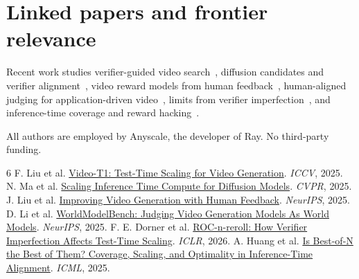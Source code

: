 \documentclass{article}
\begin{document}
\section{Linked papers and frontier relevance}

Recent work studies verifier-guided video search~\cite{videot1}, diffusion candidates and verifier alignment~\cite{ma2025}, video reward models from human feedback~\cite{videofeedback}, human-aligned judging for application-driven video~\cite{worldmodelbench}, limits from verifier imperfection~\cite{roc}, and inference-time coverage and reward hacking~\cite{huang2025}.

\begin{ack}
All authors are employed by Anyscale, the developer of Ray. No third-party funding.
\end{ack}

{\small
\setlength{\bibsep}{1pt}
\begin{thebibliography}{6}
 F. Liu et al. \href{https://openaccess.thecvf.com/content/ICCV2025/html/Liu_Video-T1_Test-time_Scaling_for_Video_Generation_ICCV_2025_paper.html}{Video-T1: Test-Time Scaling for Video Generation}. \emph{ICCV}, 2025.
 N. Ma et al. \href{https://openaccess.thecvf.com/content/CVPR2025/html/Ma_Scaling_Inference_Time_Compute_for_Diffusion_Models_CVPR_2025_paper.html}{Scaling Inference Time Compute for Diffusion Models}. \emph{CVPR}, 2025.
 J. Liu et al. \href{https://proceedings.neurips.cc/paper_files/paper/2025/hash/76227feb18ea0ee40bd15cf02c33e18e-Abstract-Conference.html}{Improving Video Generation with Human Feedback}. \emph{NeurIPS}, 2025.
 D. Li et al. \href{https://proceedings.neurips.cc/paper_files/paper/2025/hash/4ec03ed08a3fcb59e1c815b5598beff1-Abstract-Datasets_and_Benchmarks_Track.html}{WorldModelBench: Judging Video Generation Models As World Models}. \emph{NeurIPS}, 2025.
 F. E. Dorner et al. \href{https://proceedings.iclr.cc/paper_files/paper/2026/hash/f4d943fad13060f97dee47e5200367a8-Abstract-Conference.html}{ROC-n-reroll: How Verifier Imperfection Affects Test-Time Scaling}. \emph{ICLR}, 2026.
 A. Huang et al. \href{https://proceedings.mlr.press/v267/huang25c.html}{Is Best-of-N the Best of Them? Coverage, Scaling, and Optimality in Inference-Time Alignment}. \emph{ICML}, 2025.
\end{thebibliography}}
\end{document}
